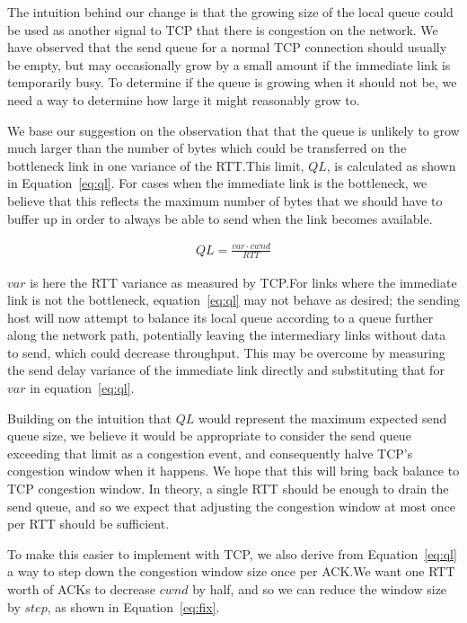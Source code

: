The intuition behind our change is that the growing size of the local queue
could be used as another signal to TCP that there is congestion on the network.
We have observed that the send queue for a
normal TCP connection should usually be empty, but may occasionally grow by
a small amount if the immediate link is temporarily busy. To determine if the queue is
growing when it should not be, we need a way to determine how large it might
reasonably grow to.

We base our suggestion on the observation that that the queue is unlikely to
grow much larger than the number of bytes which could be transferred on the
bottleneck link in one variance of the RTT.\@ This limit, $QL$, is calculated
as shown in Equation~\ref{eq:ql}. For cases when the immediate link
is the bottleneck, we believe that this reflects the maximum number of bytes that
we should have to buffer up in order to always be able to send when the link becomes available. 

\begin{align}
  QL = \frac{var \cdot cwnd}{RTT}\label{eq:ql}
\end{align}

$var$ is here the RTT
variance as measured by TCP.\@ For links where the immediate link is not
the bottleneck,
equation~\ref{eq:ql} may not behave as desired; the sending host will now
attempt to balance its local queue according to a queue further along the
network path,
potentially leaving the intermediary links without data to send, which could
decrease throughput. This may be overcome by measuring the send delay variance
of the immediate link directly and substituting that for $var$ in
equation~\ref{eq:ql}.

Building on the intuition that $QL$ would represent the maximum expected send
queue size, we believe it would be appropriate to consider the send queue
exceeding that limit as a congestion event, and consequently halve TCP's congestion
window when it happens. We hope that this will bring back balance to TCP congestion window. In
theory, a single RTT should be enough to drain the send queue, and so we expect
that adjusting the congestion window at most once per RTT should be sufficient.

To make this easier to implement with TCP, we also derive from Equation~\ref{eq:ql}
a way to step down the congestion window size once per ACK.\@ We want one RTT
worth of ACKs to decrease $cwnd$ by half, and so we can reduce the window size
by $step$, as shown in Equation~\ref{eq:fix}.

